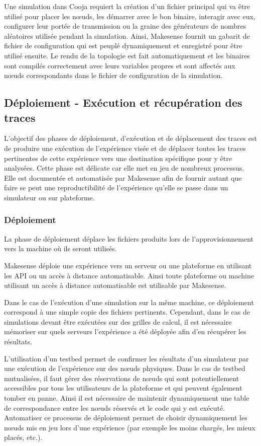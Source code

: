 Une simulation dans Cooja requiert la création d'un fichier principal qui va être utilisé pour placer les nœuds, les démarrer avec le bon binaire, interagir avec eux, configurer leur portée de transmission ou la graine des générateurs de nombres aléatoires utilisée pendant la simulation.
Ainsi, Makesense fournit un gabarit de fichier de configuration qui est peuplé dynamiquement et enregistré pour être utilisé ensuite.
Le rendu de la topologie est fait automatiquement et les binaires sont compilés correctement avec leurs variables propres et sont affectés aux nœuds correspondants dans le fichier de configuration de la simulation.

\subsection{Déploiement - Exécution et récupération des traces}
\label{automation:deploy_execute_move}

L'objectif des phases de déploiement, d'exécution et de déplacement des traces est de produire une exécution de l'expérience visée et de déplacer toutes les traces pertinentes de cette expérience vers une destination spécifique pour y être analysées.
Cette phase est délicate car elle met en jeu de nombreux processus.
Elle est documentée et automatisée par Makesense afin de fournir autant que faire se peut une reproductibilité de l'expérience qu'elle se passe dans un simulateur ou sur plateforme.

\subsubsection{Déploiement}

La phase de déploiement déplace les fichiers produits lors de l'approvisionnement vers la machine où ils seront utilisés.

Makesense déploie une expérience vers un serveur ou une plateforme en utilisant les \ac{API} ou un accès à distance automatisable.
Ainsi toute plateforme ou machine utilisant un accès à distance automatisable est utilisable par Makesense.

Dans le cas de l'exécution d'une simulation sur la même machine, ce déploiement correspond à une simple copie des fichiers pertinents.
Cependant, dans le cas de simulations devant être exécutées sur des grilles de calcul, il est nécessaire mémoriser sur quels serveurs l'expérience a été déployée afin d'en récupérer les résultats.

L'utilisation d'un testbed permet de confirmer les résultats d'un simulateur par une exécution de l'expérience sur des nœuds physiques.
Dans le cas de testbed mutualisées, il faut gérer des réservations de nœuds qui sont potentiellement accessibles par tous les utilisateurs de la plateforme et qui peuvent également tomber en panne.
Ainsi il est nécessaire de maintenir dynamiquement une table de correspondance entre les  nœuds réservés et le code qui y est exécuté.
Automatiser ce processus de déploiement permet de choisir dynamiquement les nœuds mis en jeu lors d'une expérience (par exemple les moins chargés, les mieux placés, etc.).

